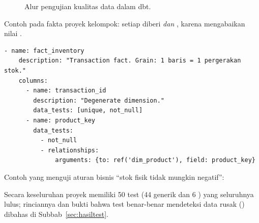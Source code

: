 \begin{figure}[H]
\centering
{}
\caption{Alur pengujian kualitas data dalam dbt.}\label{fig:alurtest}
\end{figure}

Contoh  pada fakta proyek kelompok: setiap  diberi  \emph{dan} , karena  mengabaikan nilai .
\begin{lstlisting}[style=yml, caption={Potongan \kode{models/marts/schema.yml}.}, label={lst:genericyml}]
  - name: fact_inventory
    description: "Transaction fact. Grain: 1 baris = 1 pergerakan stok."
    columns:
      - name: transaction_id
        description: "Degenerate dimension."
        data_tests: [unique, not_null]
      - name: product_key
        data_tests:
          - not_null
          - relationships:
              arguments: {to: ref('dim_product'), field: product_key}
\end{lstlisting}

Contoh  yang menguji aturan bisnis ``stok fisik tidak mungkin negatif'':


Secara keseluruhan proyek  memiliki 50 test (44 generik dan 6 ) yang seluruhnya lulus; rinciannya dan bukti bahwa test benar-benar mendeteksi data rusak () dibahas di Subbab~\ref{sec:hasiltest}.
